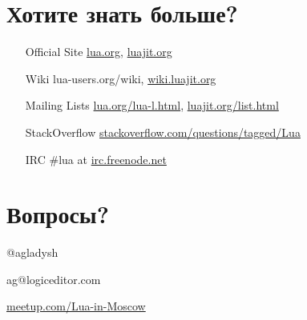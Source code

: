 \documentclass[aspectratio=169,handout,bigger]{beamer}
\begin{document}

\section{Хотите знать больше?}

\begin{frame}
  \begin{center}
  \begin{minipage}{0.6\linewidth}
  \begin{itemize}
    \item[Official Site] \url{lua.org}, \url{luajit.org}
    \item[Wiki] lua-users.org/wiki, \url{wiki.luajit.org}
    \item[Mailing Lists] \url{lua.org/lua-l.html}, \url{luajit.org/list.html}
    \item[StackOverflow] \url{stackoverflow.com/questions/tagged/Lua}
    \item[IRC] \#lua at \url{irc.freenode.net}
  \end{itemize}
  \end{minipage}
  \end{center}
\end{frame}


\section*{Вопросы?}

\begin{frame}

\begin{center}
\Huge{@agladysh}
\end{center}

\begin{center}
\Large{ag@logiceditor.com}
\end{center}

\begin{center}
\url{meetup.com/Lua-in-Moscow}
\end{center}

\end{frame}

\end{document}
